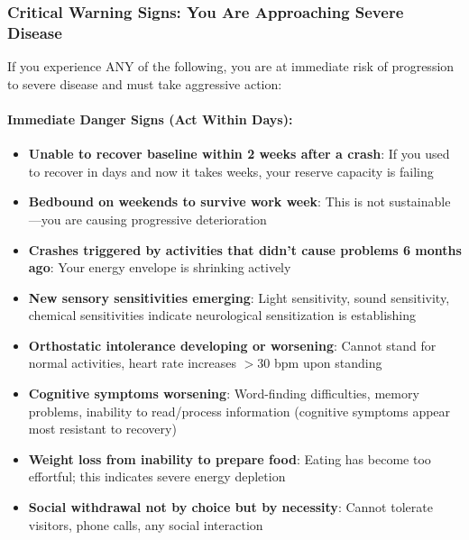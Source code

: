 \subsubsection{Critical Warning Signs: You Are Approaching Severe Disease}
\label{sec:warning-signs-severe}

If you experience ANY of the following, you are at immediate risk of progression to severe disease and must take aggressive action:

\begin{requirement}

\paragraph{Immediate Danger Signs (Act Within Days):}
\begin{itemize}
    \item \textbf{Unable to recover baseline within 2 weeks after a crash}: If you used to recover in days and now it takes weeks, your reserve capacity is failing
    \item \textbf{Bedbound on weekends to survive work week}: This is not sustainable---you are causing progressive deterioration
    \item \textbf{Crashes triggered by activities that didn't cause problems 6 months ago}: Your energy envelope is shrinking actively
    \item \textbf{New sensory sensitivities emerging}: Light sensitivity, sound sensitivity, chemical sensitivities indicate neurological sensitization is establishing
    \item \textbf{Orthostatic intolerance developing or worsening}: Cannot stand for normal activities, heart rate increases $>$30 bpm upon standing
    \item \textbf{Cognitive symptoms worsening}: Word-finding difficulties, memory problems, inability to read/process information (cognitive symptoms appear most resistant to recovery)~\cite{Chu2019}
    \item \textbf{Weight loss from inability to prepare food}: Eating has become too effortful; this indicates severe energy depletion
    \item \textbf{Social withdrawal not by choice but by necessity}: Cannot tolerate visitors, phone calls, any social interaction
\end{itemize}


\end{requirement}
